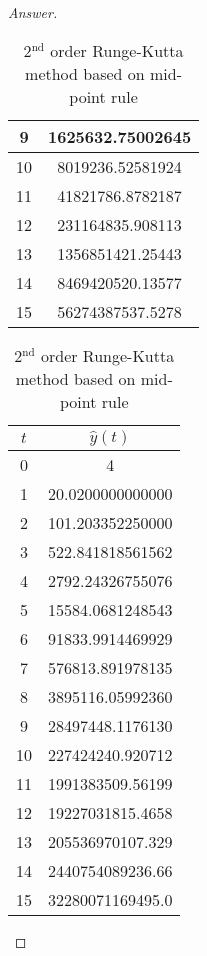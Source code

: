 \begin{proof}[Answer]
\begin{table}[H]
\begin{table}[htbp]
\begin{subtable}[t]{0.32\textwidth}
\begin{tabular}[t]{|c|c|}
		9	&	1625632.75002645	\\	\hline
		10	&	8019236.52581924	\\	\hline
		11	&	41821786.8782187	\\	\hline
		12	&	231164835.908113	\\	\hline
		13	&	1356851421.25443	\\	\hline
		14	&	8469420520.13577	\\	\hline
		15	&	56274387537.5278	\\	\hline
		\end{tabular}
		\caption{Adams-Bashforth method}
	\end{subtable}
	\begin{subtable}[t]{0.32\textwidth}
		\centering
		\begin{tabular}[t]{|c|c|}
		\hline
		\(t\)	&	\(\hat{y}(t)\)	\\	\hline
		0	&	4					\\	\hline
		1	&	20.0200000000000	\\	\hline
		2	&	101.203352250000	\\	\hline
		3	&	522.841818561562	\\	\hline
		4	&	2792.24326755076	\\	\hline
		5	&	15584.0681248543	\\	\hline
		6	&	91833.9914469929	\\	\hline
		7	&	576813.891978135	\\	\hline
		8	&	3895116.05992360	\\	\hline
		9	&	28497448.1176130	\\	\hline
		10	&	227424240.920712	\\	\hline
		11	&	1991383509.56199	\\	\hline
		12	&	19227031815.4658	\\	\hline
		13	&	205536970107.329	\\	\hline
		14	&	2440754089236.66	\\	\hline
		15	&	32280071169495.0	\\	\hline
		\end{tabular}
		\caption{2\(^\text{nd}\) order Runge-Kutta method based on mid-point rule}
	\end{subtable}


\end{table}
\end{table}
\end{proof}
